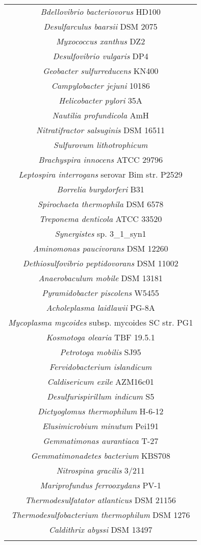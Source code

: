 \begin{table}
\begin{longtable}{|c|}
\textit{Bdellovibrio bacteriovorus} HD100\\
\textit{Desulfarculus baarsii} DSM 2075\\
\textit{Myxococcus xanthus} DZ2\\
\textit{Desulfovibrio vulgaris} DP4\\
\textit{Geobacter sulfurreducens} KN400\\
\textit{Campylobacter jejuni} 10186\\
\textit{Helicobacter pylori} 35A\\
\textit{Nautilia profundicola} AmH\\
\textit{Nitratifractor salsuginis} DSM 16511\\
\textit{Sulfurovum lithotrophicum}\\
\textit{Brachyspira innocens} ATCC 29796\\
\textit{Leptospira interrogans} serovar Bim str. P2529\\
\textit{Borrelia burgdorferi} B31\\
\textit{Spirochaeta thermophila} DSM 6578\\
\textit{Treponema denticola} ATCC 33520\\
\textit{Synergistes} sp. 3\_1\_syn1\\
\textit{Aminomonas paucivorans} DSM 12260\\
\textit{Dethiosulfovibrio peptidovorans} DSM 11002\\
\textit{Anaerobaculum mobile} DSM 13181\\
\textit{Pyramidobacter piscolens} W5455\\
\textit{Acholeplasma laidlawii} PG-8A\\
\textit{Mycoplasma mycoides} subsp. mycoides SC str. PG1\\
\textit{Kosmotoga olearia} TBF 19.5.1\\
\textit{Petrotoga mobilis} SJ95\\
\textit{Fervidobacterium islandicum}\\
\textit{Caldisericum exile} AZM16c01\\
\textit{Desulfurispirillum indicum} S5\\
\textit{Dictyoglomus thermophilum} H-6-12\\
\textit{Elusimicrobium minutum} Pei191\\
\textit{Gemmatimonas aurantiaca} T-27\\
\textit{Gemmatimonadetes bacterium} KBS708\\
\textit{Nitrospina gracilis} 3/211\\
\textit{Mariprofundus ferrooxydans} PV-1\\
\textit{Thermodesulfatator atlanticus} DSM 21156\\
\textit{Thermodesulfobacterium thermophilum} DSM 1276\\
\textit{Caldithrix abyssi} DSM 13497\\
\hline
\end{tabular}
\caption[]{}
\label{tab:edicer_genome_bacteria}
\end{longtable}



\end{table}
